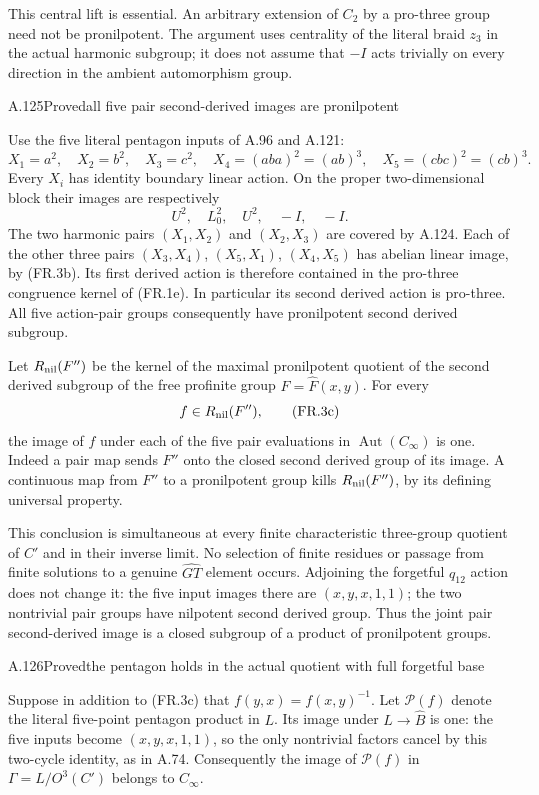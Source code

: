 This central lift is essential. An arbitrary extension of
$C_2$ by a pro-three group need not be pronilpotent. The
argument uses centrality of the literal braid $z_3$ in
the actual harmonic subgroup; it does not assume that
$-I$ acts trivially on every direction in the ambient
automorphism group.

\begin{statement}{A.125}{Proved}{all five pair second-derived images are pronilpotent}
\end{statement}
Use the five literal pentagon inputs of A.96 and A.121:
\[
 X_1=a^2,\quad X_2=b^2,\quad X_3=c^2,\quad
 X_4=(aba)^2=(ab)^3,\quad X_5=(cbc)^2=(cb)^3.
 \tag{FR.3a}
\]
Every $X_i$ has identity boundary linear action. On the
proper two-dimensional block their images are respectively
\[
                    U^2,\quad L_0^2,\quad U^2,\quad -I,\quad -I.
 \tag{FR.3b}
\]
The two harmonic pairs $(X_1,X_2)$ and $(X_2,X_3)$
are covered by A.124. Each of the other three pairs
$(X_3,X_4)$, $(X_5,X_1)$, $(X_4,X_5)$ has abelian
linear image, by (FR.3b). Its first derived action is
therefore contained in the pro-three congruence kernel
of (FR.1e). In particular its second derived action
is pro-three. All five action-pair groups consequently
have pronilpotent second derived subgroup.

Let $R_{\rm nil}(F'')$ be the kernel of the maximal
pronilpotent quotient of the second derived subgroup of
the free profinite group $F=\widehat F(x,y)$. For every
\[
                         f\in R_{\rm nil}(F''),
 \tag{FR.3c}
\]
the image of $f$ under each of the five pair evaluations
in $\operatorname{Aut}(C_\infty)$ is one. Indeed a pair
map sends $F''$ onto the closed second derived group
of its image. A continuous map from $F''$ to a
pronilpotent group kills $R_{\rm nil}(F'')$, by its
defining universal property.

This conclusion is simultaneous at every finite characteristic
three-group quotient of $C'$ and in their inverse limit.
No selection of finite residues or passage from finite
solutions to a genuine $\widehat{GT}$ element occurs.
Adjoining the forgetful $q_{12}$ action does not change it:
the five input images there are $(x,y,x,1,1)$; the two
nontrivial pair groups have nilpotent second derived
group. Thus the joint pair second-derived image is a
closed subgroup of a product of pronilpotent groups.

\begin{statement}{A.126}{Proved}{the pentagon holds in the actual quotient with full forgetful base}
\end{statement}
Suppose in addition to (FR.3c) that
$f(y,x)=f(x,y)^{-1}$. Let $\mathcal P(f)$ denote the
literal five-point pentagon product in $L$. Its image
under $L\to\widehat B$ is one: the five inputs become
$(x,y,x,1,1)$, so the only nontrivial factors cancel
by this two-cycle identity, as in A.74. Consequently
the image of $\mathcal P(f)$ in $\Gamma=L/O^3(C')$
belongs to $C_\infty$.

